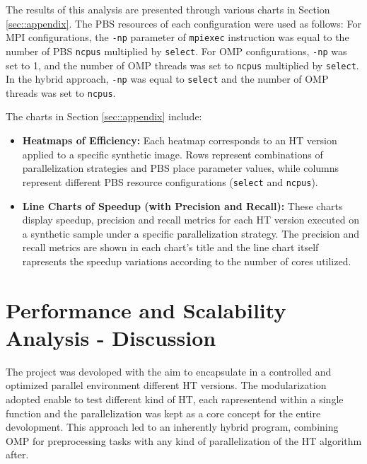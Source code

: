 \documentclass[conference]{IEEEtran}
\begin{document}
    The results of this analysis are presented through various charts in Section \ref{sec::appendix}. The PBS resources of each configuration were used as follows: For MPI configurations, the \texttt{-np} parameter of \texttt{mpiexec} instruction was equal to the number of PBS \texttt{ncpus} multiplied by \texttt{select}. For OMP configurations, \texttt{-np} was set to 1, and the number of OMP threads was set to \texttt{ncpus} multiplied by \texttt{select}. In the hybrid approach, \texttt{-np} was equal to \texttt{select} and the number of OMP threads was set to \texttt{ncpus}.
    
    The charts in Section \ref{sec::appendix} include:
    \begin{itemize}
        \item \textbf{Heatmaps of Efficiency:} Each heatmap corresponds to an HT version applied to a specific synthetic image. Rows represent combinations of parallelization strategies and PBS place parameter values, while columns represent different PBS resource configurations (\texttt{select} and \texttt{ncpus}).
    
        \item \textbf{Line Charts of Speedup (with Precision and Recall):} These charts display speedup, precision and recall metrics for each HT version executed on a synthetic sample under a specific parallelization strategy. The precision and recall metrics are shown in each chart's title and the line chart itself rapresents the speedup variations according to the number of cores utilized.

    \end{itemize}
    
\section{Performance and Scalability Analysis - Discussion}
\label{subsec:discussion}
        
        The project was devoloped with the aim to encapsulate in a controlled and optimized parallel environment different HT versions. The modularization adopted enable to test different kind of HT, each rapresentend within a single function and the parallelization was kept as a core concept for the entire devolopment. This approach led to an inherently hybrid program, combining OMP for preprocessing tasks with any kind of parallelization of the  HT algorithm after.
        
\end{document}

